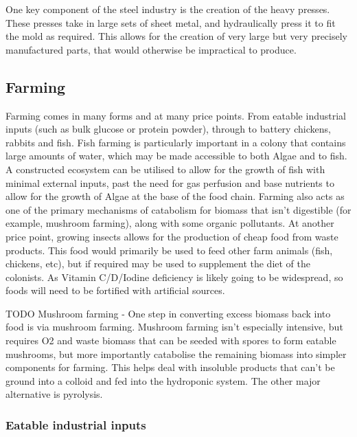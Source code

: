 \documentclass[10pt]{article}
\begin{document}
One key component of the steel industry is the creation of the heavy presses. These presses take in large sets of sheet metal, and hydraulically press it to fit the mold as required. This allows for the creation of very large but very precisely manufactured parts, that would otherwise be impractical to produce.

\subsection*{Farming}

Farming comes in many forms and at many price points. From eatable industrial inputs (such as bulk glucose or protein powder), through to battery chickens, rabbits and fish. Fish farming is particularly important in a colony that contains large amounts of water, which may be made accessible to both Algae and to fish. A constructed ecosystem can be utilised to allow for the growth of fish with minimal external inputs, past the need for gas perfusion and base nutrients to allow for the growth of Algae at the base of the food chain. Farming also acts as one of the primary mechanisms of catabolism for biomass that isn't digestible (for example, mushroom farming), along with some organic pollutants. At another price point, growing insects allows for the production of cheap food from waste products. This food would primarily be used to feed other farm animals (fish, chickens, etc), but if required may be used to supplement the diet of the colonists. As Vitamin C/D/Iodine deficiency is likely going to be widespread, so foods will need to be fortified with artificial sources.

TODO Mushroom farming - One step in converting excess biomass back into food is via mushroom farming. Mushroom farming isn't especially intensive, but requires O2 and waste biomass that can be seeded with spores to form eatable mushrooms, but more importantly catabolise the remaining biomass into simpler components for farming. This helps deal with insoluble products that can't be ground into a colloid and fed into the hydroponic system. The other major alternative is pyrolysis.


\subsubsection*{Eatable industrial inputs}
\end{document}
